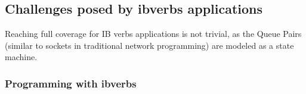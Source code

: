 






\subsection{Challenges posed by ibverbs applications}\label{s:ibverbs-challenges}

Reaching full coverage for IB verbs applications is not trivial, as the Queue Pairs (similar to sockets in
traditional network programming) are modeled as a state machine.

\subsubsection{Programming with ibverbs}





